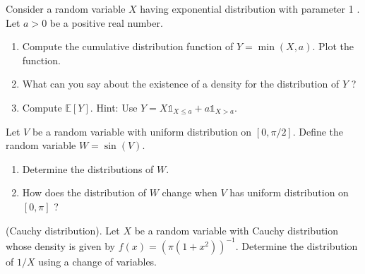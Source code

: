 \documentclass{article}
\begin{document}
\begin{Exercise}
  Consider a random variable $X$ having exponential distribution with parameter 1 . Let $a>0$ be a positive real number.
  \begin{enumerate}
    \item Compute the cumulative distribution function of $Y=\min (X, a)$. Plot the
          function.

    \item What can you say about the existence of a density for the distribution of $Y$ ?

    \item Compute $\mathbb{E}[Y]$. Hint: Use $Y=X \mathbb{1}_{X \leq a}+a
            \mathbb{1}_{X>a}$.
  \end{enumerate}
\end{Exercise}



\begin{Exercise} Let $V$ be a random variable with uniform distribution on $[0, \pi / 2]$. Define the random variable $W=\sin (V)$.
  \begin{enumerate}
    \item Determine the distributions of $W$.
    \item How does the distribution of $W$ change when $V$ has uniform distribution on $[0, \pi]$ ?
  \end{enumerate}
\end{Exercise}

\begin{Exercise} (Cauchy distribution). Let $X$ be a random variable with Cauchy distribution whose density is given by $f(x)=\left(\pi\left(1+x^{2}\right)\right)^{-1}$. Determine the distribution of $1 / X$ using a change of variables.
\end{Exercise}
\end{document}
